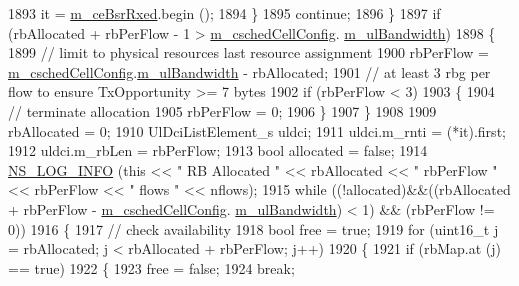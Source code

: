 \begin{DoxyCode}
1893               it = \hyperlink{classns3_1_1FdTbfqFfMacScheduler_a4affe9fe434a4cb87f5875ddf1766d61}{m\_ceBsrRxed}.begin ();
1894             \}
1895           \textcolor{keywordflow}{continue};
1896         \}
1897       \textcolor{keywordflow}{if} (rbAllocated + rbPerFlow - 1 > \hyperlink{classns3_1_1FdTbfqFfMacScheduler_a73d5d866713fa06e1cc6186b0f556693}{m\_cschedCellConfig}.
      \hyperlink{structns3_1_1FfMacCschedSapProvider_1_1CschedCellConfigReqParameters_a5ab5b102878e6e7e7727a14af4a64d2f}{m\_ulBandwidth})
1898         \{
1899           \textcolor{comment}{// limit to physical resources last resource assignment}
1900           rbPerFlow = \hyperlink{classns3_1_1FdTbfqFfMacScheduler_a73d5d866713fa06e1cc6186b0f556693}{m\_cschedCellConfig}.\hyperlink{structns3_1_1FfMacCschedSapProvider_1_1CschedCellConfigReqParameters_a5ab5b102878e6e7e7727a14af4a64d2f}{m\_ulBandwidth} - rbAllocated;
1901           \textcolor{comment}{// at least 3 rbg per flow to ensure TxOpportunity >= 7 bytes}
1902           \textcolor{keywordflow}{if} (rbPerFlow < 3)
1903             \{
1904               \textcolor{comment}{// terminate allocation}
1905               rbPerFlow = 0;      
1906             \}
1907         \}
1908 
1909       rbAllocated = 0;
1910       UlDciListElement\_s uldci;
1911       uldci.m\_rnti = (*it).first;
1912       uldci.m\_rbLen = rbPerFlow;
1913       \textcolor{keywordtype}{bool} allocated = \textcolor{keyword}{false};
1914       \hyperlink{group__logging_gafbd73ee2cf9f26b319f49086d8e860fb}{NS\_LOG\_INFO} (\textcolor{keyword}{this} << \textcolor{stringliteral}{" RB Allocated "} << rbAllocated << \textcolor{stringliteral}{" rbPerFlow "} << rbPerFlow << \textcolor{stringliteral}{"
       flows "} << nflows);
1915       \textcolor{keywordflow}{while} ((!allocated)&&((rbAllocated + rbPerFlow - \hyperlink{classns3_1_1FdTbfqFfMacScheduler_a73d5d866713fa06e1cc6186b0f556693}{m\_cschedCellConfig}.
      \hyperlink{structns3_1_1FfMacCschedSapProvider_1_1CschedCellConfigReqParameters_a5ab5b102878e6e7e7727a14af4a64d2f}{m\_ulBandwidth}) < 1) && (rbPerFlow != 0))
1916         \{
1917           \textcolor{comment}{// check availability}
1918           \textcolor{keywordtype}{bool} free = \textcolor{keyword}{true};
1919           \textcolor{keywordflow}{for} (uint16\_t j = rbAllocated; j < rbAllocated + rbPerFlow; j++)
1920             \{
1921               \textcolor{keywordflow}{if} (rbMap.at (j) == \textcolor{keyword}{true})
1922                 \{
1923                   free = \textcolor{keyword}{false};
1924                   \textcolor{keywordflow}{break};

\end{DoxyCode}
